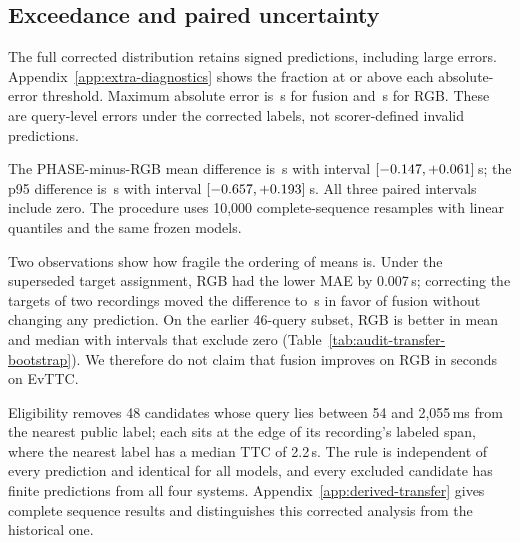 \subsection{Exceedance and paired uncertainty}
The full corrected distribution retains signed predictions, including large errors. Appendix~\ref{app:extra-diagnostics} shows the fraction at or above each absolute-error threshold. Maximum absolute error is \AuditFusionMax{}\,s for fusion and \AuditRgbMax{}\,s for RGB. These are query-level errors under the corrected labels, not scorer-defined invalid predictions.



The PHASE-minus-RGB mean difference is \AuditMeanDelta{}\,s with interval $[-0.147,+0.061]$\,s; the p95 difference is \AuditPninetyfiveDelta{}\,s with interval $[-0.657,+0.193]$\,s. All three paired intervals include zero. The procedure uses 10,000 complete-sequence resamples with linear quantiles and the same frozen models.

Two observations show how fragile the ordering of means is. Under the superseded target assignment, RGB had the lower MAE by 0.007\,s; correcting the targets of two recordings moved the difference to \AuditMeanDelta{}\,s in favor of fusion without changing any prediction. On the earlier 46-query subset, RGB is better in mean and median with intervals that exclude zero (Table~\ref{tab:audit-transfer-bootstrap}). We therefore do not claim that fusion improves on RGB in seconds on EvTTC.

Eligibility removes 48 candidates whose query lies between 54 and 2,055\,ms from the nearest public label; each sits at the edge of its recording's labeled span, where the nearest label has a median TTC of 2.2\,s. The rule is independent of every prediction and identical for all models, and every excluded candidate has finite predictions from all four systems. Appendix~\ref{app:derived-transfer} gives complete sequence results and distinguishes this corrected analysis from the historical one.

\FloatBarrier
